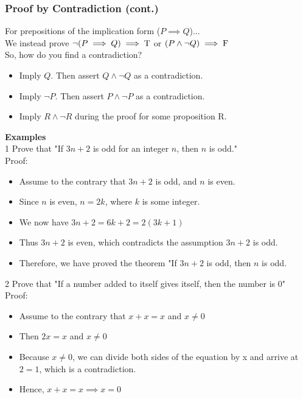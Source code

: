 \documentclass[12pt, letterpaper]{article}
\newcommand{\exheader}[1][ex]{{\tiny{#1}\normalsize}}
\begin{document}
\subsubsection*{Proof by Contradiction (cont.)}
For prepositions of the implication form ($P \implies Q$)... \\ We instead prove $\neg(P \implies Q) \implies \textnormal{T}$ or $(P \land \neg Q) \implies \textnormal{F}$ \\
So, how do you find a contradiction? \\
\vspace*{-0.25cm}
\begin{itemize}[leftmargin=0.55cm, label={\faAngleRight}]
	\item Imply $Q$. Then assert $Q \land \neg Q$ as a contradiction.
	\item Imply $\neg P$. Then assert $P \land \neg P$ as a contradiction.
	\item Imply $R \land \neg R$ during the proof for some proposition R.
\end{itemize}
\bigbreak
\textbf{Examples} \\
\exheader[1] Prove that "If $3n + 2$ is odd for an integer $n$, then $n$ is odd." \\ Proof:
\vspace*{-0.25cm}
\begin{itemize}[leftmargin=*, label={}]
	\item Assume to the contrary that $3n + 2$ is odd, and $n$ is even.
	\item Since $n$ is even, $n = 2k$, where $k$ is some integer.
	\item We now have $3n +2 = 6k + 2 = 2(3k + 1)$
	\item Thus $3n + 2$ is even, which contradicts the assumption $3n + 2$ is odd.
	\item Therefore, we have proved the theorem "If $3n + 2$ is odd, then $n$ is odd.
\end{itemize}
\bigbreak

\exheader[2] Prove that "If a number added to itself gives itself, then the number is 0" \\ Proof:
\vspace*{-0.25cm}
\begin{itemize}[leftmargin=*, label={}]
	\item Assume to the contrary that $x + x = x$ and $ x \not = 0$
	\item Then $2x = x$ and $x \not = 0$
	\item Because $x \not = 0$, we can divide both sides of the equation by x and arrive at $2 = 1$, which is a contradiction.
	\item Hence, $x + x = x \implies x = 0$
\end{itemize}
\end{document}
